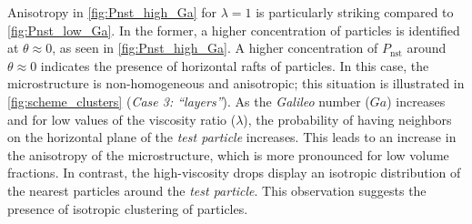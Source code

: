 Anisotropy in \ref{fig:Pnst_high_Ga} for $\lambda=1$ is particularly striking compared to \ref{fig:Pnst_low_Ga}. 
In the former, a higher concentration of particles is identified at $\theta \approx 0$, as seen in \ref{fig:Pnst_high_Ga}. 
A higher concentration of $P_\text{nst}$ around $\theta \approx 0$ indicates the presence of horizontal rafts of particles. 
In this case, the microstructure is non-homogeneous and anisotropic; this situation is illustrated in \ref{fig:scheme_clusters} (\textit{Case 3: ``layers''}). 
As the \textit{Galileo} number ($Ga$) increases and for low values of the viscosity ratio ($\lambda$), the probability of having neighbors on the horizontal plane of the \textit{test particle} increases. 
This leads to an increase in the anisotropy of the microstructure, which is more pronounced for low volume fractions. 
In contrast, the high-viscosity drops display an isotropic distribution of the nearest particles around the \textit{test particle}. 
This observation suggests the presence of isotropic clustering of particles.




